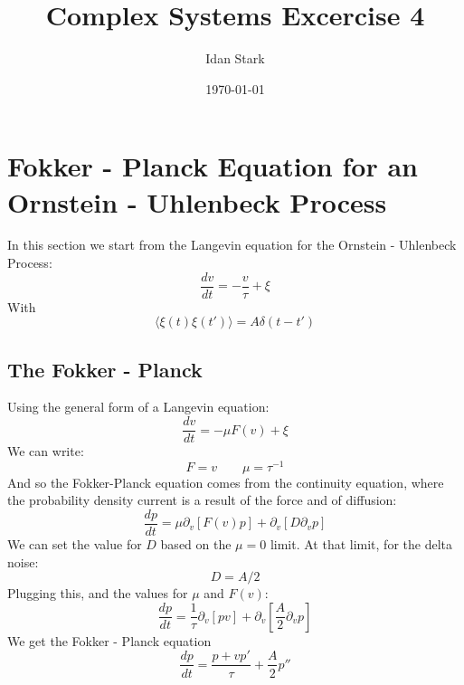 \documentclass{article}
\title{Complex Systems Excercise 4}
\author{Idan Stark}
\date{\today}
\begin{document}
\maketitle

\section{Fokker - Planck Equation for an Ornstein - Uhlenbeck Process}
In this section we start from the Langevin equation for the Ornstein - Uhlenbeck Process:
\begin{equation}
    \frac{dv}{dt} = -\frac{v}{\tau} + \xi
\end{equation}
With
\begin{equation}
    \langle \xi(t) \xi(t') \rangle = A \delta(t - t')
\end{equation}
\subsection{The Fokker - Planck}
Using the general form of a Langevin equation:
\begin{equation}
    \frac{dv}{dt} = -\mu F(v) + \xi
\end{equation}
We can write:
\begin{equation}
    F = v \qquad \mu = \tau^{-1}
\end{equation}
And so the Fokker-Planck equation comes from the continuity equation, where the probability density current is a result of the force and of diffusion:
\begin{equation}
    \frac{dp}{dt} = \mu \partial_v \left[F(v) p\right] + \partial_v \left[D \partial_v p\right]
\end{equation}
We can set the value for $D$ based on the $\mu = 0$ limit. At that limit, for the delta noise:
\begin{equation}
    D = A/2
\end{equation}
Plugging this, and the values for $\mu$ and $F(v)$:
\begin{equation}
    \frac{dp}{dt} = \frac{1}{\tau} \partial_v \left[pv\right] + \partial_v \left[\frac{A}{2} \partial_v p\right]
\end{equation}
We get the Fokker - Planck equation
\begin{equation}
    \boxed{\frac{dp}{dt} = \frac{p + vp'}{\tau} + \frac{A}{2}p''}
\end{equation}
\end{document}
